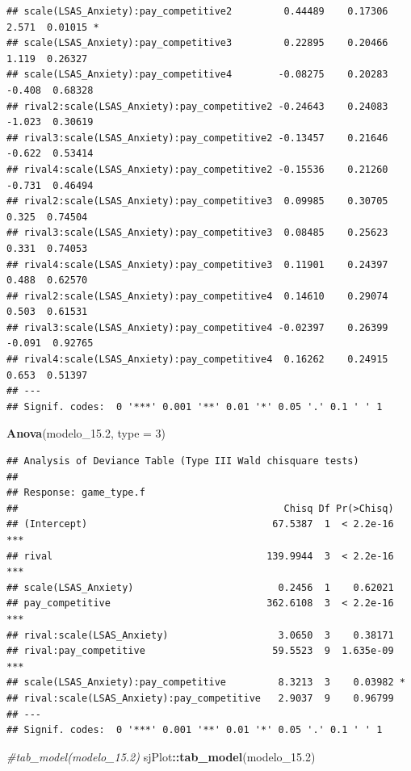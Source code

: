 \documentclass[
]{article}
\newenvironment{Shaded}{\begin{snugshade}}{\end{snugshade}}
\newcommand{\AttributeTok}[1]{\textcolor[rgb]{0.13,0.29,0.53}{#1}}
\newcommand{\CommentTok}[1]{\textcolor[rgb]{0.56,0.35,0.01}{\textit{#1}}}
\newcommand{\DecValTok}[1]{\textcolor[rgb]{0.00,0.00,0.81}{#1}}
\newcommand{\FloatTok}[1]{\textcolor[rgb]{0.00,0.00,0.81}{#1}}
\newcommand{\FunctionTok}[1]{\textcolor[rgb]{0.13,0.29,0.53}{\textbf{#1}}}
\newcommand{\NormalTok}[1]{#1}
\newcommand{\SpecialCharTok}[1]{\textcolor[rgb]{0.81,0.36,0.00}{\textbf{#1}}}
\begin{document}
\begin{verbatim}
## scale(LSAS_Anxiety):pay_competitive2         0.44489    0.17306   2.571  0.01015 *  
## scale(LSAS_Anxiety):pay_competitive3         0.22895    0.20466   1.119  0.26327    
## scale(LSAS_Anxiety):pay_competitive4        -0.08275    0.20283  -0.408  0.68328    
## rival2:scale(LSAS_Anxiety):pay_competitive2 -0.24643    0.24083  -1.023  0.30619    
## rival3:scale(LSAS_Anxiety):pay_competitive2 -0.13457    0.21646  -0.622  0.53414    
## rival4:scale(LSAS_Anxiety):pay_competitive2 -0.15536    0.21260  -0.731  0.46494    
## rival2:scale(LSAS_Anxiety):pay_competitive3  0.09985    0.30705   0.325  0.74504    
## rival3:scale(LSAS_Anxiety):pay_competitive3  0.08485    0.25623   0.331  0.74053    
## rival4:scale(LSAS_Anxiety):pay_competitive3  0.11901    0.24397   0.488  0.62570    
## rival2:scale(LSAS_Anxiety):pay_competitive4  0.14610    0.29074   0.503  0.61531    
## rival3:scale(LSAS_Anxiety):pay_competitive4 -0.02397    0.26399  -0.091  0.92765    
## rival4:scale(LSAS_Anxiety):pay_competitive4  0.16262    0.24915   0.653  0.51397    
## ---
## Signif. codes:  0 '***' 0.001 '**' 0.01 '*' 0.05 '.' 0.1 ' ' 1
\end{verbatim}

\begin{Shaded}
\begin{Highlighting}[]
\FunctionTok{Anova}\NormalTok{(modelo\_15}\FloatTok{.2}\NormalTok{, }\AttributeTok{type =} \DecValTok{3}\NormalTok{)}
\end{Highlighting}
\end{Shaded}

\begin{verbatim}
## Analysis of Deviance Table (Type III Wald chisquare tests)
## 
## Response: game_type.f
##                                              Chisq Df Pr(>Chisq)    
## (Intercept)                                67.5387  1  < 2.2e-16 ***
## rival                                     139.9944  3  < 2.2e-16 ***
## scale(LSAS_Anxiety)                         0.2456  1    0.62021    
## pay_competitive                           362.6108  3  < 2.2e-16 ***
## rival:scale(LSAS_Anxiety)                   3.0650  3    0.38171    
## rival:pay_competitive                      59.5523  9  1.635e-09 ***
## scale(LSAS_Anxiety):pay_competitive         8.3213  3    0.03982 *  
## rival:scale(LSAS_Anxiety):pay_competitive   2.9037  9    0.96799    
## ---
## Signif. codes:  0 '***' 0.001 '**' 0.01 '*' 0.05 '.' 0.1 ' ' 1
\end{verbatim}

\begin{Shaded}
\begin{Highlighting}[]
\CommentTok{\#tab\_model(modelo\_15.2)}
\NormalTok{sjPlot}\SpecialCharTok{::}\FunctionTok{tab\_model}\NormalTok{(modelo\_15}\FloatTok{.2}\NormalTok{)}
\end{Highlighting}
\end{Shaded}
\end{document}

